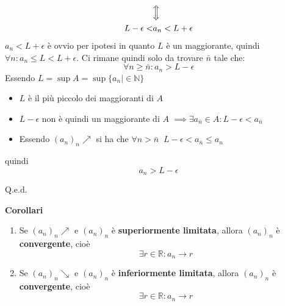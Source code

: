 {\begin{enumerate}
\begin{align*}
            &\Big\Updownarrow\\
            L - \epsilon < &a_n < L + \epsilon
        \end{align*}
        $a_n < L + \epsilon$ è ovvio per ipotesi in quanto $L$ è un maggiorante, quindi $\forall n: a_n \leq L < L + \epsilon$. Ci rimane quindi solo da trovare $\bar{n}$ tale che:
        \begin{equation*}
            \forall n \geq \bar{n} : a_n > L - \epsilon
        \end{equation*}
        Essendo $L = \sup A = \sup \{a_n | \in \mathbb{N}\}$
        \begin{itemize}
            \item $L$ è il più piccolo dei maggioranti di $A$
            \item $L - \epsilon$ non è quindi un maggiorante di $A$ $\implies \exists a_{\bar{n}} \in A : L -\epsilon < a_{\bar{n}}$
            \item Essendo $(a_n)_n \nearrow$ si ha che $\forall n > \bar{n} \;\; L-\epsilon < a_{\bar{n}} \leq a_{n}$
        \end{itemize}
        quindi
        \begin{equation*}
            a_n > L - \epsilon
        \end{equation*}
        
        \hfill Q.e.d.
\end{enumerate}
}
\textbf{Corollari} \label{corol_successioni}
\begin{enumerate}
    \item Se $(a_n)_n \nearrow$ e $(a_n)_n$ è \textbf{superiormente limitata}, allora $(a_n)_n$ è \textbf{convergente}, cioè
        \begin{equation*}
            \exists r \in \mathbb{R} : a_n \xrightarrow{\quad} r
        \end{equation*}
    \item Se $(a_n)_n \searrow$ e $(a_n)_n$ è \textbf{inferiormente limitata}, allora $(a_n)_n$ è \textbf{convergente}, cioè
        \begin{equation*}
            \exists r \in \mathbb{R} : a_n \xrightarrow{\quad} r
        \end{equation*}
\end{enumerate}
